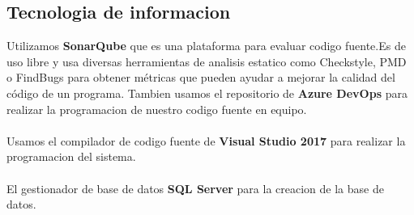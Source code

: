 \documentclass[12pt,letterpaper]{article}
\begin{document}
    \subsection{Tecnologia de informacion}

    Utilizamos \textbf{SonarQube} que es una plataforma para evaluar 
    codigo fuente.Es de uso libre y usa diversas herramientas de analisis estatico
     como Checkstyle, PMD o FindBugs para obtener métricas que pueden ayudar a mejorar 
     la calidad del código de un programa.
    \newpage
     Tambien usamos el repositorio de \textbf{Azure DevOps} para realizar la
     programacion de nuestro codigo fuente en equipo.
     \\
     \\Usamos el compilador de codigo fuente de \textbf{Visual Studio 2017} para realizar la 
     programacion del sistema.
     \\
     \\El gestionador de base de datos \textbf{SQL Server} para la creacion de la base de datos.
\end{document}
